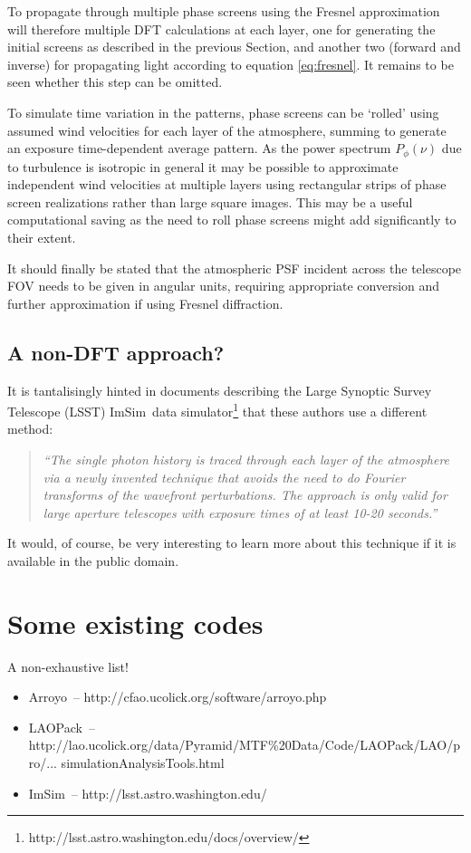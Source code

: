 \documentclass[preprint]{aastex}
\newcommand{\arroyo}{{\sc Arroyo}}
\newcommand{\laopack}{{\sc LAOPack}}
\newcommand{\imsim}{{\sc ImSim}}
\begin{document}
To propagate through multiple phase screens using the Fresnel
approximation will therefore multiple DFT calculations at each layer,
one for generating the initial screens as described in the previous
Section, and another two (forward and inverse) for propagating light
according to equation \eqref{eq:fresnel}.  It remains to be seen
whether this step can be omitted.

To simulate time variation in the patterns, phase screens can be
`rolled' using assumed wind velocities for each layer of the
atmosphere, summing to generate an exposure time-dependent average pattern.  
As the power spectrum $P_{\phi}(\nu)$ due to turbulence
is isotropic in general it may be possible to approximate independent
wind velocities at multiple layers using rectangular strips of phase screen
realizations rather than large square images.  This may be a useful
computational saving as the need to roll phase screens might add
significantly to their extent.

It should finally be stated that the atmospheric PSF incident across
the telescope FOV needs to be given in angular units, requiring
appropriate conversion and further approximation if using Fresnel diffraction.

\subsection{A non-DFT approach?}
It is tantalisingly hinted in documents describing the Large Synoptic
Survey Telescope (LSST) \imsim\ data
simulator\footnote{http://lsst.astro.washington.edu/docs/overview/}
that these authors use a different method:
\begin{quote}
\emph{``The single
photon history is traced through each layer of the
atmosphere via a newly invented technique that
avoids the need to do Fourier transforms of the
wavefront perturbations. The approach is only
valid for large aperture telescopes with exposure
times of at least 10-20 seconds.''}
\end{quote}
It would, of course, be very interesting to learn more about this
technique if it is available in the public domain.

\section{Some existing codes}
A non-exhaustive list!

\begin{itemize}

\item \arroyo\ -- http://cfao.ucolick.org/software/arroyo.php


\item \laopack\ --
  http://lao.ucolick.org/data/Pyramid/MTF\%20Data/Code/LAOPack/LAO/pro/...
simulationAnalysisTools.html

\item \imsim\ -- http://lsst.astro.washington.edu/

\end{itemize}
\end{document}
